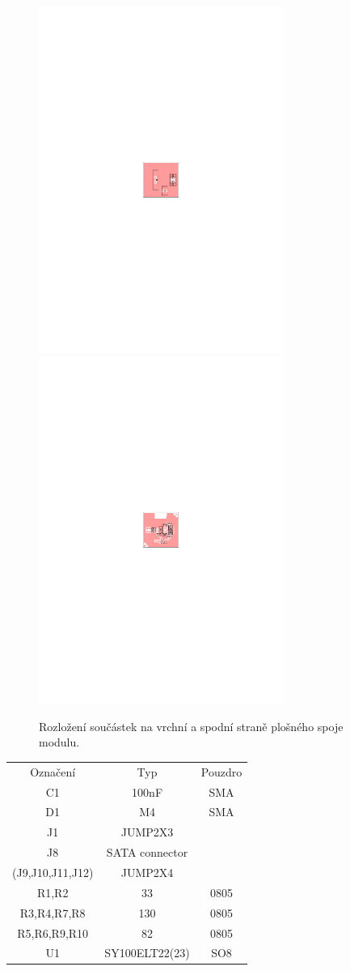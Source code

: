 \documentclass[12pt,a4paper,oneside]{article}
\begin{document}
\begin{figure} [htbp]
  \includegraphics[trim = 90mm 132mm 85mm 132mm, clip, width=8cm]{../../CAM_DOC/O1.pdf}
  \includegraphics[trim = 90mm 132mm 85mm 132mm, clip, width=8cm]{../../CAM_DOC/O2.pdf}
  \caption{Rozložení součástek na vrchní a spodní straně plošného spoje modulu.}
\end{figure}

\begin{tabular}{ccc}
Označení & Typ & Pouzdro\\ 
C1 & 100nF & SMA \\ 
D1 & M4 & SMA \\ 
J1 & JUMP2X3 &  \\ 
J8 & SATA connector &  \\
(J9,J10,J11,J12) & JUMP2X4 \\
R1,R2	 & 33	& 0805\\
R3,R4,R7,R8	&	130 & 0805\\
R5,R6,R9,R10	&	82 & 0805\\
U1	&	SY100ELT22(23) & SO8 \\
\end{tabular} 
\end{document}
